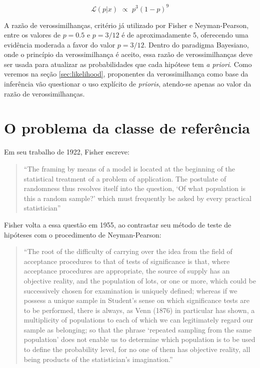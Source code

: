 \begin{equation}
	\mathcal{L}(p|x) \,\, \propto \,\, p^3(1-p)^9
\end{equation}

A razão de verossimilhanças, critério já utilizado por Fisher e Neyman-Pearson, entre os valores de $p=0.5$ e $p=3/12$ é de 
aproximadamente 5, oferecendo uma evidência moderada a favor do valor $p=3/12$. Dentro do paradigma Bayesiano, onde o princípio
da verossimilhança é aceito, essa razão de verossimilhanças deve ser usada para atualizar as probabilidades que cada hipótese
tem {\em a priori}. Como veremos na seção \ref{sec:likelihood}, proponentes da verossimilhança como base da inferência
vão questionar o uso explícito de {\em prioris}, atendo-se apenas ao valor da razão de verossimilhanças.

\section{O problema da classe de referência}\label{sec:classref}

Em seu trabalho de 1922, Fisher escreve:

\begin{quote}
``The framing by means of a model is located at the beginning of the
statistical treatment of a problem of application. The postulate of randomness thus resolves itself into the 
question, `Of what population is this a random sample?' which must frequently be asked by every practical
statistician''\citep{Fisher1922}
\end{quote}

Fisher volta a essa questão em 1955, ao contrastar seu método de teste de hipóteses com o procedimento de Neyman-Pearson:

\begin{quote}
``The root of the difficulty of carrying over the idea from the field of acceptance procedures to that of tests of significance
is that, where acceptance procedures are appropriate, the source of supply has an objective reality, and the population
of lots, or one or more, which could be successively chosen for examination is uniquely defined; whereas if we possess a unique
sample in Student's sense on which significance tests are to be performed, there is always, as Venn (1876) in particular has
shown, a multiplicity of populations to each of which we can legitimately regard our sample as belonging; so that the phrase
`repeated sampling from the same population' does not enable us to determine which population is to be used to define the
probability level, for no one of them has objective reality, all being products of the statistician's imagination.''
\citep{Fisher1955}
\end{quote}

